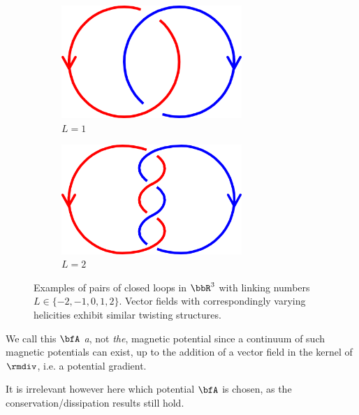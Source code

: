 \begin{figure}[!ht]
\begin{subfigure}{0.2634\textwidth}
        \end{subfigure}%
        \begin{subfigure}{0.1815\textwidth}
            \centering
            \includegraphics[width = 0.75\textwidth]{2 - fluid component/1 - structures/2 - global/images/1.png}
            \caption{$L = 1$}
        \end{subfigure}%
        \begin{subfigure}{0.1872\textwidth}
            \centering
            \includegraphics[width = 0.75\textwidth]{2 - fluid component/1 - structures/2 - global/images/2.png}
            \caption{$L = 2$}
        \end{subfigure}
        \caption{Examples of pairs of closed loops in $\bbR^{3}$ with linking numbers $L  \in  \{-2, -1, 0, 1, 2\}$. Vector fields with correspondingly varying helicities exhibit similar twisting structures.}
        \label{fig:linking numbers}
    \end{figure}
    
    \begin{remark}
        We call this $\bfA$ \emph{a}, not \emph{the}, magnetic potential since a continuum of such magnetic potentials can exist, up to the addition of a vector field in the kernel of $\rmdiv$, i.e. a potential gradient.
        
        It is irrelevant however here which potential $\bfA$ is chosen, as the conservation/dissipation results still hold.
    \end{remark}

